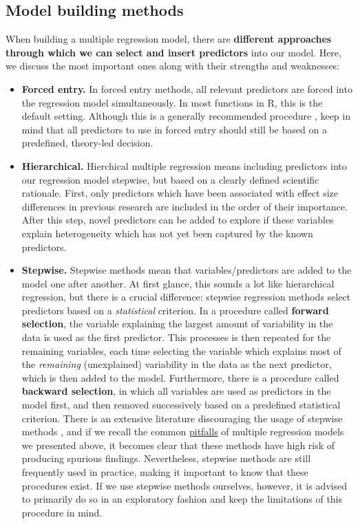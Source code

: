 \documentclass[]{book}
\providecommand{\tightlist}{%
  \setlength{\itemsep}{0pt}\setlength{\parskip}{0pt}}
\begin{document}
\hypertarget{model-building-methods}{%
\subsection{Model building methods}\label{model-building-methods}}

When building a multiple regression model, there are \textbf{different approaches through which we can select and insert predictors} into our model. Here, we discuss the most important ones along with their strengths and weaknesses:

\begin{itemize}
\tightlist
\item
  \textbf{Forced entry.} In forced entry methods, all relevant predictors are forced into the regression model simultaneously. In most functions in R, this is the default setting. Although this is a generally recommended procedure \citep{field2012discovering}, keep in mind that all predictors to use in forced entry should still be based on a predefined, theory-led decision.
\item
  \textbf{Hierarchical.} Hierchical multiple regression means including predictors into our regression model stepwise, but based on a clearly defined scientific rationale. First, only predictors which have been associated with effect size differences in previous research are included in the order of their importance. After this step, novel predictors can be added to explore if these variables explain heterogeneity which has not yet been captured by the known predictors.
\item
  \textbf{Stepwise.} Stepwise methods mean that variables/predictors are added to the model one after another. At first glance, this sounds a lot like hierarchical regression, but there is a crucial difference: stepwise regression methods select predictors based on a \emph{statistical} criterion. In a procedure called \textbf{forward selection}, the variable explaining the largest amount of variability in the data is used as the first predictor. This processes is then repeated for the remaining variables, each time selecting the variable which explains most of the \emph{remaining} (unexplained) variability in the data as the next predictor, which is then added to the model. Furthermore, there is a procedure called \textbf{backward selection}, in which all variables are used as predictors in the model first, and then removed successively based on a predefined statistical criterion. There is an extensive literature discouraging the usage of stepwise methods \citep{whittingham2006we, chatfield1995model}, and if we recall the common \protect\hyperlink{pitfalls}{pitfalls} of multiple regression models we presented above, it becomes clear that these methods have high risk of producing spurious findings. Nevertheless, stepwise methods are still frequently used in practice, making it important to know that these procedures exist. If we use stepwise methods ourselves, however, it is advised to primarily do so in an exploratory fashion and keep the limitations of this procedure in mind.

\end{itemize}
\end{document}
